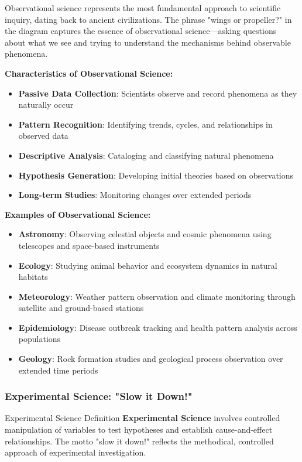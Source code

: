 Observational science represents the most fundamental approach to scientific inquiry, dating back to ancient civilizations. The phrase "wings or propeller?" in the diagram captures the essence of observational science—asking questions about what we see and trying to understand the mechanisms behind observable phenomena.

\textbf{Characteristics of Observational Science:}
\begin{itemize}
    \item \textbf{Passive Data Collection}: Scientists observe and record phenomena as they naturally occur
    \item \textbf{Pattern Recognition}: Identifying trends, cycles, and relationships in observed data
    \item \textbf{Descriptive Analysis}: Cataloging and classifying natural phenomena
    \item \textbf{Hypothesis Generation}: Developing initial theories based on observations
    \item \textbf{Long-term Studies}: Monitoring changes over extended periods
\end{itemize}

\textbf{Examples of Observational Science:}
\begin{itemize}
    \item \textbf{Astronomy}: Observing celestial objects and cosmic phenomena using telescopes and space-based instruments
    \item \textbf{Ecology}: Studying animal behavior and ecosystem dynamics in natural habitats
    \item \textbf{Meteorology}: Weather pattern observation and climate monitoring through satellite and ground-based stations
    \item \textbf{Epidemiology}: Disease outbreak tracking and health pattern analysis across populations
    \item \textbf{Geology}: Rock formation studies and geological process observation over extended time periods
\end{itemize}

\subsubsection{Experimental Science: "Slow it Down!"}

\begin{conceptcard}{Experimental Science Definition}
\textbf{Experimental Science} involves controlled manipulation of variables to test hypotheses and establish cause-and-effect relationships. The motto "slow it down!" reflects the methodical, controlled approach of experimental investigation.
\end{conceptcard}


